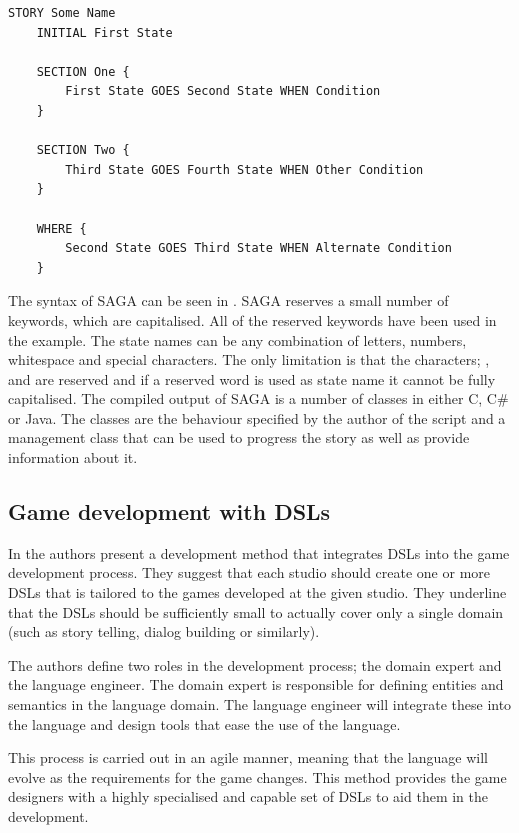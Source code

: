 \begin{lstlisting}[caption={SAGA Syntax}, label=lst:saga-syntax]
STORY Some Name
    INITIAL First State
    
    SECTION One {
        First State GOES Second State WHEN Condition
    }
    
    SECTION Two {
        Third State GOES Fourth State WHEN Other Condition
    }
    
    WHERE {
        Second State GOES Third State WHEN Alternate Condition
    }
\end{lstlisting}

The syntax of SAGA can be seen in . SAGA reserves a small number of keywords, which are capitalised. All of the reserved keywords have been used in the example. The state names can be any combination of letters, numbers, whitespace and special characters. The only limitation is that the characters; \squote{\{}, \squote{\}} and \squote{,} are reserved and if a reserved word is used as state name it cannot be fully capitalised. The compiled output of SAGA is a number of classes in either C, C\# or Java. The classes are the behaviour specified by the author of the script and a management class that can be used to progress the story as well as provide information about it.

\subsection{Game development with \acp{DSL}}
In \cite{Walter:2011:IDL:2071423.2071475} the authors present a development method that integrates \acp{DSL} into the game development process. They suggest that each studio should create one or more \acp{DSL} that is tailored to the games developed at the given studio. They underline that the \acp{DSL} should be sufficiently small to actually cover only a single domain (such as story telling, dialog building or similarly). 

The authors define two roles in the development process; the domain expert and the language engineer. The domain expert is responsible for defining entities and semantics in the language domain. The language engineer will integrate these into the language and design tools that ease the use of the language.

This process is carried out in an agile manner, meaning that the language will evolve as the requirements for the game changes. This method provides the game designers with a highly specialised and capable set of \acp{DSL} to aid them in the development.



